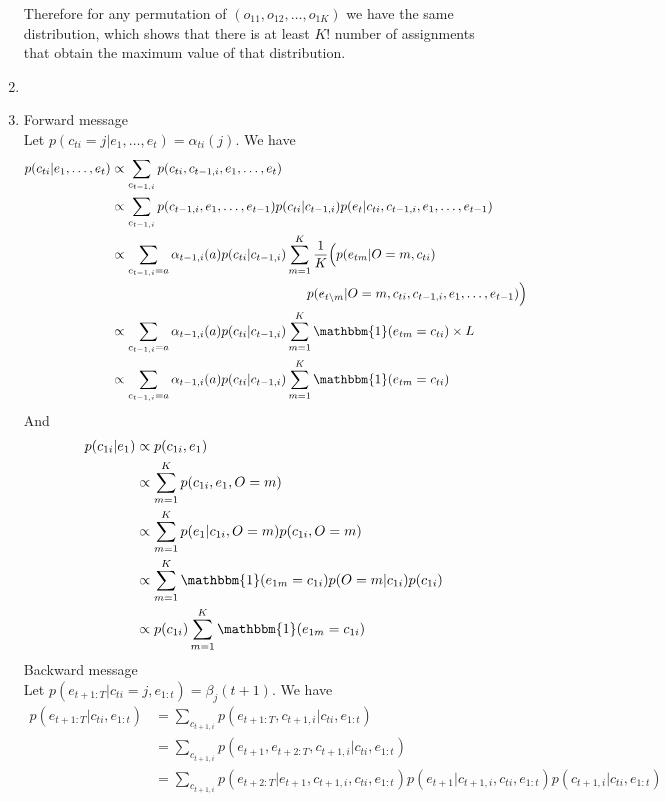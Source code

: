 \documentclass[12pt]{article}
\begin{document}
\begin{enumerate}[label=(\alph*)]
		Therefore for any permutation of $(o_{11}, o_{12},\dots,o_{1K})$ we have the same distribution, which shows that there is at least $K!$ number of assignments that obtain the maximum value of that distribution.
	\item
	\item
		Forward message \\
		Let $p(c_{ti}=j|e_1,\dots,e_t) = \alpha_{ti}(j)$. We have
		\begin{align*}
			p(c_{ti}|e_1,\dots,e_t) &\propto \sum_{c_{t-1,i}}p(c_{ti}, c_{t-1, i},e_1,\dots,e_t) \\
			&\propto\sum_{c_{t-1,i}}p(c_{t-1, i},e_1,\dots,e_{t-1})p(c_{ti}|c_{t-1, i})p(e_t|c_{ti}, c_{t-1,i},e_1,\dots,e_{t-1}) \\
			&\propto\sum_{c_{t-1,i}=a}\alpha_{t-1,i}(a)p(c_{ti}|c_{t-1, i})\sum_{m=1}^K \frac{1}{K} \Big( p(e_{tm}|O=m, c_{ti})\\
			&\qquad\qquad\qquad\qquad\qquad\qquad\qquad\quad p(e_{t\setminus m}|O=m, c_{ti}, c_{t-1, i},e_1,\dots,e_{t-1}) \Big) \\
			&\propto\sum_{c_{t-1,i}=a}\alpha_{t-1,i}(a)p(c_{ti}|c_{t-1, i})\sum_{m=1}^K\mathbbm{1}(e_{tm}=c_{ti}) \times L \\
			&\propto\sum_{c_{t-1,i}=a}\alpha_{t-1,i}(a)p(c_{ti}|c_{t-1, i})\sum_{m=1}^K\mathbbm{1}(e_{tm}=c_{ti})
		\end{align*}
		And
		\begin{align*}
			p(c_{1i}|e_1) &\propto p(c_{1i}, e_1) \\
			&\propto \sum_{m=1}^K p(c_{1i}, e_1, O=m) \\
			&\propto \sum_{m=1}^K p(e_1|c_{1i}, O=m) p(c_{1i}, O=m) \\
			&\propto \sum_{m=1}^K \mathbbm{1}(e_{1m}=c_{1i}) p(O=m|c_{1i}) p (c_{1i}) \\
			&\propto p(c_{1i})\sum_{m=1}^K \mathbbm{1}(e_{1m}=c_{1i})
		\end{align*}
		Backward message \\
		Let $p(e_{t+1:T}|c_{ti}=j, e_{1:t})=\beta_j(t+1)$. We have
		\begin{align*}
			p(e_{t+1:T}|c_{ti}, e_{1:t}) &= \sum_{c_{t+1, i}}p(e_{t+1:T}, c_{t+1,i}|c_{ti},e_{1:t}) \\
			&= \sum_{c_{t+1, i}} p(e_{t+1},e_{t+2:T},c_{t+1,i}|c_{ti}, e_{1:t}) \\
			&= \sum_{c_{t+1, i}} p(e_{t+2:T}|e_{t+1}, c_{t+1,i}, c_{ti}, e_{1:t})p(e_{t+1}|c_{t+1, i},c_{ti},e_{1:t})p(c_{t+1,i}|c_{ti}, e_{1:t}) \\

\end{align*}
\end{enumerate}
\end{document}

